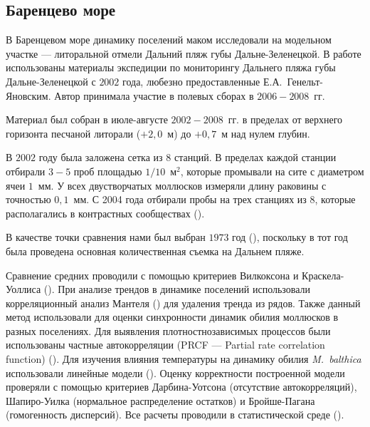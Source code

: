 \afterpage{\clearpage}

        \subsection{Баренцево море}

В Баренцевом море динамику поселений маком исследовали на модельном участке --- литоральной отмели Дальний пляж губы Дальне-Зеленецкой. 
В работе использованы материалы экспедиции по мониторингу Дальнего пляжа губы Дальне-Зеленецкой с $2002$ года, любезно предоставленные Е.\:А.~Генельт-Яновским.
Автор принимала участие в полевых сборах в $2006 - 2008$~гг.

Материал был собран в июле-августе $2002 - 2008$~гг. в пределах от верхнего горизонта песчаной литорали ($+2,0$~м) до $+0,7$~м над нулем глубин. 

 В $2002$ году была заложена сетка из $8$ станций. 
 В пределах каждой станции отбирали $3 - 5$ проб площадью $1/10$~м$^2$, которые промывали на сите с диаметром ячеи $1$~мм. 
 У всех двустворчатых моллюсков измеряли длину раковины с точностью $0,1$~мм. 
 С 2004 года отбирали пробы на трех станциях из $8$, которые располагались в контрастных сообществах (\cite{Genelt_Dalnezeleneckaya_2008}). 

В качестве точки сравнения нами был выбран $1973$ год (\cite{Streltsov_et_al_1974, Agarova_et_al_1976}), поскольку в тот год была проведена основная количественная съемка на Дальнем пляже. 


Сравнение средних проводили с помощью критериев Вилкоксона и Краскела-Уоллиса (\cite{Hollander_et_al_2013}).
При анализе трендов в динамике поселений использовали корреляционный анализ Мантеля (\cite{Legendre_Legendre_2012}) для удаления тренда из рядов. 
Также данный метод использовали для оценки синхронности динамик обилия моллюсков в разных поселениях.
Для выявления плотностнозависимых процессов были использованы частные автокорреляции (PRCF --- Partial rate correlation function) (\cite{Berryman_Turchin_2001}).
Для изучения влияния температуры на динамику обилия \textit{M.~balthica} использовали линейные модели (\cite{Chambers_Hastie_1991}).
Оценку корректности построенной модели проверяли с помощью критериев Дарбина-Уотсона (отсутствие автокорреляций), Шапиро-Уилка (нормальное распределение остатков) и Бройше-Пагана (гомогенность дисперсий).
Все расчеты проводили в статистической среде \R{} (\cite{R_2014}).

